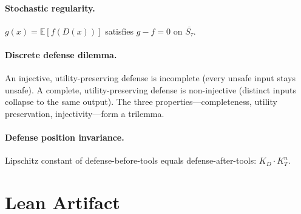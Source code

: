 \documentclass{article}
\newcommand{\cl}[1]{\overline{#1}}
\begin{document}
\paragraph{Stochastic regularity.}
$g(x) = \mathbb{E}[f(D(x))]$ satisfies $g - f = 0$ on $\cl{S_\tau}$.

\paragraph{Discrete defense dilemma.}
An injective, utility-preserving defense is incomplete (every unsafe
input stays unsafe). A complete, utility-preserving defense is
non-injective (distinct inputs collapse to the same output).
The three properties---completeness, utility preservation,
injectivity---form a trilemma.

\paragraph{Defense position invariance.}
Lipschitz constant of defense-before-tools equals defense-after-tools:
$K_D \cdot K_T^n$.


\section{Lean Artifact}
\label{app:artifact}
\end{document}
